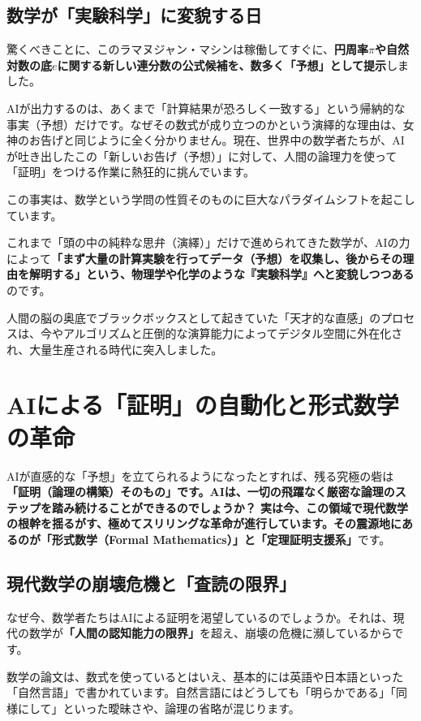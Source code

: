 \subsection{数学が「実験科学」に変貌する日}

驚くべきことに、このラマヌジャン・マシンは稼働してすぐに、\textbf{円周率\(\pi\)や自然対数の底\(e\)に関する新しい連分数の公式候補を、数多く「予想」として提示}しました。

AIが出力するのは、あくまで「計算結果が恐ろしく一致する」という帰納的な事実（予想）だけです。なぜその数式が成り立つのかという演繹的な理由は、女神のお告げと同じように全く分かりません。現在、世界中の数学者たちが、AIが吐き出したこの「新しいお告げ（予想）」に対して、人間の論理力を使って「証明」をつける作業に熱狂的に挑んでいます。

この事実は、数学という学問の性質そのものに巨大なパラダイムシフトを起こしています。

これまで「頭の中の純粋な思弁（演繹）」だけで進められてきた数学が、AIの力によって\textbf{「まず大量の計算実験を行ってデータ（予想）を収集し、後からその理由を解明する」という、物理学や化学のような『実験科学』へと変貌しつつある}のです。

人間の脳の奥底でブラックボックスとして起きていた「天才的な直感」のプロセスは、今やアルゴリズムと圧倒的な演算能力によってデジタル空間に外在化され、大量生産される時代に突入しました。

\section{AIによる「証明」の自動化と形式数学の革命}

AIが直感的な「予想」を立てられるようになったとすれば、残る究極の砦は\textbf{「証明（論理の構築）そのもの」です。AIは、一切の飛躍なく厳密な論理のステップを踏み続けることができるのでしょうか？ 実は今、この領域で現代数学の根幹を揺るがす、極めてスリリングな革命が進行しています。その震源地にあるのが「形式数学（Formal Mathematics）」と「定理証明支援系」}です。

\subsection{現代数学の崩壊危機と「査読の限界」}

なぜ今、数学者たちはAIによる証明を渇望しているのでしょうか。それは、現代の数学が\textbf{「人間の認知能力の限界」}を超え、崩壊の危機に瀕しているからです。

数学の論文は、数式を使っているとはいえ、基本的には英語や日本語といった「自然言語」で書かれています。自然言語にはどうしても「明らかである」「同様にして」といった曖昧さや、論理の省略が混じります。

